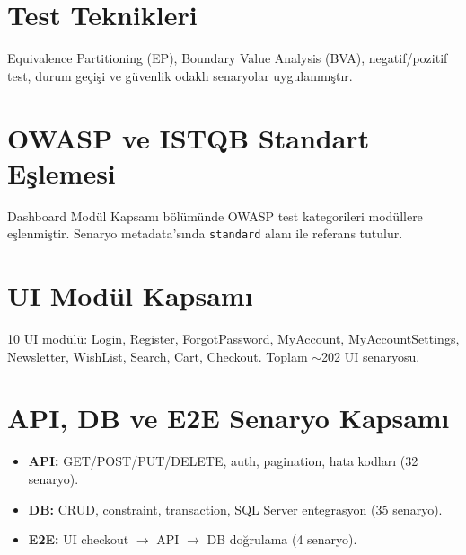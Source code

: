 \section{Test Teknikleri}
Equivalence Partitioning (EP), Boundary Value Analysis (BVA), negatif/pozitif test, durum geçişi ve güvenlik odaklı senaryolar uygulanmıştır.

\section{OWASP ve ISTQB Standart Eşlemesi}
Dashboard Modül Kapsamı bölümünde OWASP test kategorileri modüllere eşlenmiştir. Senaryo metadata'sında \texttt{standard} alanı ile referans tutulur.

\section{UI Modül Kapsamı}
10 UI modülü: Login, Register, ForgotPassword, MyAccount, MyAccountSettings, Newsletter, WishList, Search, Cart, Checkout. Toplam $\sim$202 UI senaryosu.

\section{API, DB ve E2E Senaryo Kapsamı}
\begin{itemize}
  \item \textbf{API:} GET/POST/PUT/DELETE, auth, pagination, hata kodları (32 senaryo).
  \item \textbf{DB:} CRUD, constraint, transaction, SQL Server entegrasyon (35 senaryo).
  \item \textbf{E2E:} UI checkout $\rightarrow$ API $\rightarrow$ DB doğrulama (4 senaryo).
\end{itemize}

